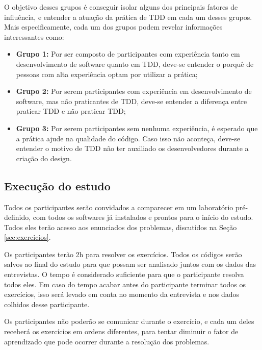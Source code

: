 O objetivo desses grupos é conseguir isolar alguns dos principais fatores de influência,
e entender a atuação da prática de TDD em cada um desses grupos. Mais especificamente,
cada um dos grupos podem revelar informações interessantes como:

\begin{itemize}
	\item \textbf{Grupo 1:} Por ser composto de participantes com experiência tanto
	em desenvolvimento de software quanto em TDD, deve-se entender o porquê de
	pessoas com alta experiência optam por utilizar a prática;
	
	\item \textbf{Grupo 2:} Por serem participantes com experiência em desenvolvimento
	de software, mas não praticantes de TDD, deve-se entender a diferença entre
	praticar TDD e não praticar TDD;
		
	\item \textbf{Grupo 3:} Por serem participantes sem nenhuma experiência, é esperado que
	a prática ajude na qualidade do código. Caso isso não aconteça, deve-se entender o motivo de TDD
	não ter auxiliado os desenvolvedores durante a criação do design.
\end{itemize}

\subsection{Execução do estudo}
\label{sec:execucao}	

Todos os participantes serão convidados a comparecer em um laboratório pré-definido,
com todos os softwares já instalados e prontos para o início do estudo. Todos eles
terão acesso aos enunciados dos problemas, discutidos na
Seção \ref{sec:exercicios}.

Os participantes terão 2h para resolver os exercícios. 
Todos os códigos serão salvos ao final do estudo para que possam ser analisado juntos
com os dados das entrevistas.
O tempo é considerado suficiente
para que o participante resolva todos eles. Em caso do tempo acabar antes do participante
terminar todos os exercícios, isso será levado em conta no momento da entrevista e nos
dados colhidos desse participante.

Os participantes não poderão se comunicar durante o exercício, e cada um deles receberá
os exercícios em ordens diferentes, para tentar diminuir o fator de aprendizado que 
pode ocorrer durante a resolução dos problemas. 

